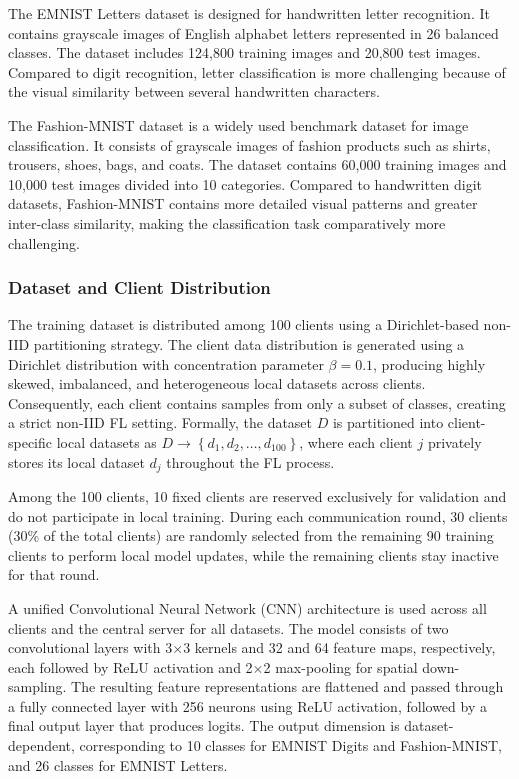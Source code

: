 \documentclass[a4paper,fleqn]{cas-dc}
\begin{document}
The EMNIST Letters dataset is designed for handwritten letter recognition. It contains grayscale images of English alphabet letters represented in 26 balanced classes. The dataset includes 124,800 training images and 20,800 test images. Compared to digit recognition, letter classification is more challenging because of the visual similarity between several handwritten characters.

The Fashion-MNIST dataset is a widely used benchmark dataset for image classification. It consists of grayscale images of fashion products such as shirts, trousers, shoes, bags, and coats. The dataset contains 60,000 training images and 10,000 test images divided into 10 categories. Compared to handwritten digit datasets, Fashion-MNIST contains more detailed visual patterns and greater inter-class similarity, making the classification task comparatively more challenging.

\subsubsection{Dataset and Client Distribution}
\label{sec:4.2.2}

The training dataset is distributed among 100 clients using a Dirichlet-based non-IID partitioning strategy. The client data distribution is generated using a Dirichlet distribution with concentration parameter $\beta = 0.1$, producing highly skewed, imbalanced, and heterogeneous local datasets across clients. Consequently, each client contains samples from only a subset of classes, creating a strict non-IID FL setting. Formally, the dataset $D$ is partitioned into client-specific local datasets as $D \rightarrow \left\{ d_{1}, d_{2}, \ldots, d_{100} \right\}$, where each client $j$ privately stores its local dataset $d_{j}$ throughout the FL process.

Among the 100 clients, 10 fixed clients are reserved exclusively for validation and do not participate in local training. During each communication round, 30 clients (30\% of the total clients) are randomly selected from the remaining 90 training clients to perform local model updates, while the remaining clients stay inactive for that round.

A unified Convolutional Neural Network (CNN) architecture is used across all clients and the central server for all datasets. The model consists of two convolutional layers with 3$\times$3 kernels and 32 and 64 feature maps, respectively, each followed by ReLU activation and 2$\times$2 max-pooling for spatial down-sampling. The resulting feature representations are flattened and passed through a fully connected layer with 256 neurons using ReLU activation, followed by a final output layer that produces logits. The output dimension is dataset-dependent, corresponding to 10 classes for EMNIST Digits and Fashion-MNIST, and 26 classes for EMNIST Letters.
\end{document}
